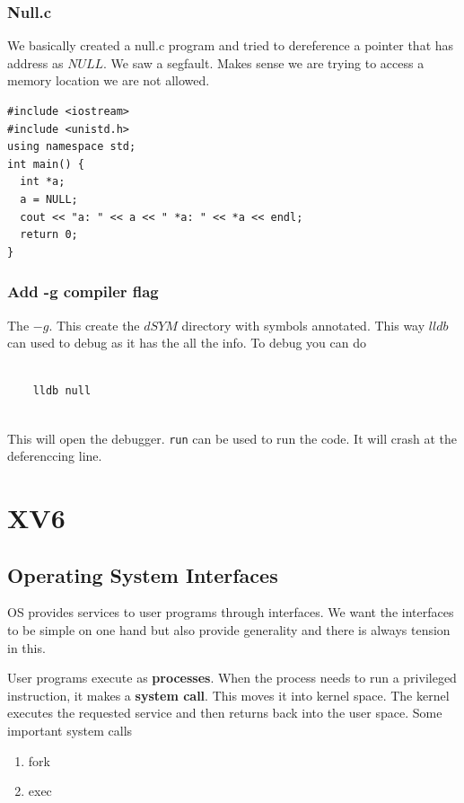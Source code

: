 \documentclass[11pt]{article}
\begin{document}
\subsubsection{Null.c}

We basically created a null.c program and tried to dereference a pointer that has address as $NULL$. We saw a segfault. Makes sense we are trying to access a memory location we are not allowed. 

\begin{lstlisting}[style=cppstyle]
#include <iostream>
#include <unistd.h>
using namespace std;
int main() {
  int *a;
  a = NULL;
  cout << "a: " << a << " *a: " << *a << endl;
  return 0;
}
\end{lstlisting}

\subsubsection{Add -g compiler flag}
The $-g$. This create the $dSYM$ directory with symbols annotated. This way $lldb$ can used to debug as it has the all the info. To debug you can do
\begin{lstlisting}[style=asmstyle]

	lldb null
	
\end{lstlisting}
This will open the debugger. \lstinline[style=bashstyle]|run| can be used to run the code. It will crash at the deferenccing line.

\section{XV6}

\subsection{Operating System Interfaces}
OS provides services to user programs through interfaces. We want the interfaces to be simple on one hand but also provide generality and there is always tension in this. 

User programs execute as \textbf{processes}. When the process needs to run a privileged instruction, it makes a \textbf{system call}. This moves it into kernel space. The kernel executes the requested service and then returns back into the user space. Some important system calls 
\begin{enumerate}
	\item fork
	\item exec 
\end{enumerate}
\end{document}
